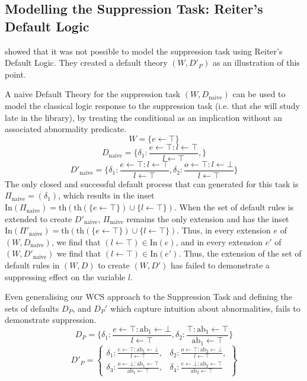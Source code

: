 \subsection{Modelling the Suppression Task: Reiter's Default Logic} \label{ssec:supReit}
\cite{ragni2017formal} showed that it was not possible to model the suppression task using Reiter's Default Logic. They created a default theory $(W, D'_P)$ as an illustration of this point.

A naive Default Theory for the suppression task $(W,D_\text{naive})$ can be used to model the classical logic response to the suppression task (i.e. that she will study late in the library), by treating the conditional as an implication without an associated abnormality predicate.
\[
W=\{e\leftarrow \top\}
\]
\[
D_\text{naive}=\{\delta_1:\frac{e\leftarrow \top:l \leftarrow \top}{l\leftarrow\top} ,
\}
\]
\[
D'_\text{naive}=\{\delta_1:\frac{e\leftarrow \top:l \leftarrow \top}{l\leftarrow\top} ,
\delta_2:\frac{o\leftarrow \top:l \leftarrow \bot}{l\leftarrow\top}
\}
\]
The only closed and successful default process that can generated for this task is $\Pi_\text{naive}=(\delta_1)$, which results in the inset $\text{In}(\Pi_\text{naive})=\text{th}(\text{th}(\{e\leftarrow \top\})\cup\{l \leftarrow \top\})$. When the set of default rules is extended to create $D'_\text{naive}$, $\Pi_\text{naive}$ remains the only extension and has the inset $\text{In}(\Pi'_\text{naive})=\text{th}(\text{th}(\{e\leftarrow \top\})\cup\{l \leftarrow \top\})$. Thus, in every extension $e$ of $(W,D_\text{naive})$, we find that $(l \leftarrow \top)\in \text{In}(e)$, and in every extension $e'$ of $(W,D'_\text{naive})$ we find that $(l \leftarrow \top)\in \text{In}(e')$. Thus, the extension of the set of default rules in $(W,D)$ to create $(W,D')$ has failed to demonstrate a suppressing effect on the variable $l$.

Even generalising our WCS approach to the Suppression Task and defining the sets of defaults $D_P$, and $D_P'$ which capture intuition about abnormalities, fails to demonstrate suppression.
\[
D_P=\{\delta_1:\frac{e\leftarrow \top:\text{ab}_1 \leftarrow \bot}{l\leftarrow\top} ,
\delta_2:\frac{\top:\text{ab}_1 \leftarrow \top}{\text{ab}_1\leftarrow\top}
\}
\]
\[
D'_P=\left\lbrace \begin{matrix}\delta_1:\frac{e\leftarrow \top:\text{ab}_1 \leftarrow \bot}{l\leftarrow\top} ,&
\delta_2:\frac{o\leftarrow \top:\text{ab}_2 \leftarrow \bot}{l\leftarrow\top},\\
\delta_3:\frac{o\leftarrow \bot:\text{ab}_1 \leftarrow \top}{\text{ab}_1\leftarrow\top},&
\delta_4:\frac{e\leftarrow \bot:\text{ab}_2 \leftarrow \top}{\text{ab}_2\leftarrow\top}
\end{matrix}\right\rbrace
\]

